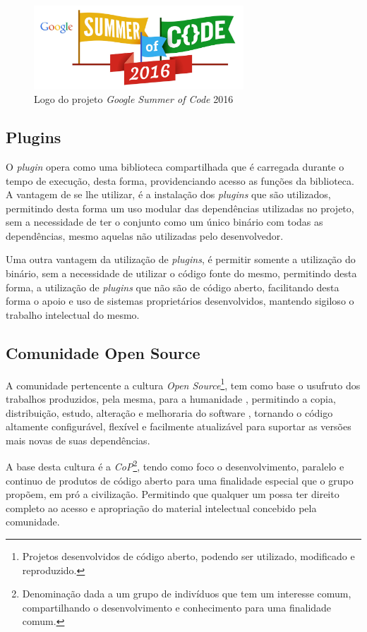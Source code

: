 \begin{figure}[!htb]
  \centering
  \caption[Logo GSoC 2016]{Logo do projeto \textit{Google Summer of Code} 2016}
  \label{fig:gsoc2016}
  \includegraphics[width=0.7\textwidth]{figuras/gsoc2016.jpg}
\end{figure}

\subsection{Plugins}
O \textit{plugin} opera como uma biblioteca compartilhada que é carregada durante o tempo de execução, desta forma, providenciando acesso
as funções da biblioteca. A vantagem de se lhe utilizar, é a instalação dos \textit{plugins} que são utilizados, permitindo desta forma
um uso modular das dependências utilizadas no projeto, sem a necessidade de ter o conjunto como um único binário com todas as dependências,
mesmo aquelas não utilizadas pelo desenvolvedor.

Uma outra vantagem da utilização de \textit{plugins}, é permitir somente a utilização do binário, sem a necessidade de utilizar
o código fonte do mesmo, permitindo desta forma, a utilização de \textit{plugins} que não são de código aberto, facilitando desta
forma o apoio e uso de sistemas proprietários desenvolvidos, mantendo sigiloso o trabalho intelectual do mesmo.

\subsection{Comunidade Open Source}

A comunidade pertencente a cultura \textit{Open Source}\footnote{Projetos desenvolvidos de código aberto, podendo ser utilizado,
modificado e reproduzido.}, tem como base o usufruto dos trabalhos produzidos, pela mesma, para a humanidade \cite{wynants2005open},
permitindo a copia, distribuição, estudo, alteração e melhoraria do software \cite{filosofia},
tornando o código altamente configurável, flexível e facilmente atualizável para suportar as versões mais novas
de suas dependências.

A base desta cultura é a \textit{CoP}\footnote{Denominação dada a um grupo de indivíduos que tem um interesse comum,
compartilhando o desenvolvimento e conhecimento para uma finalidade comum.}\cite{wenger1998communities}, tendo como foco o desenvolvimento,
paralelo e continuo de produtos de código aberto para uma finalidade especial que o grupo propõem, em pró a civilização. Permitindo
que qualquer um possa ter direito completo ao acesso e apropriação do material intelectual concebido pela comunidade.

